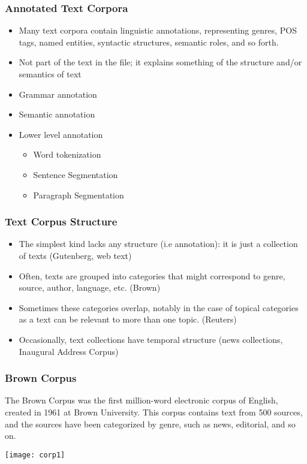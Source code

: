 \begin{frame}[fragile]\frametitle{Annotated Text Corpora}
\begin{itemize}
\item Many text corpora contain linguistic annotations, representing genres, POS tags, named entities, syntactic structures, semantic roles, and so forth. 
\item Not part of the text in the file; it explains something of the structure and/or semantics of text
\item Grammar annotation
\item Semantic annotation
\item Lower level annotation
\begin{itemize}
\item Word tokenization
\item Sentence Segmentation 
\item Paragraph Segmentation
\end{itemize}
\end{itemize}
\end{frame}


\begin{frame}[fragile]\frametitle{Text Corpus Structure}
\begin{itemize}
\item The simplest kind lacks any structure (i.e annotation): it is just a collection of texts (Gutenberg, web text)
\item Often, texts are grouped into categories that might correspond to genre, source, author, language, etc. (Brown)
\item Sometimes these categories overlap, notably in the case of topical categories as a text can be relevant to more than one topic. (Reuters)
\item Occasionally, text collections have temporal structure (news collections, Inaugural Address Corpus)
\end{itemize}
\end{frame}


\begin{frame}[fragile]\frametitle{Brown Corpus}
The Brown Corpus was the first million-word electronic corpus of English, created in 1961 at Brown University. This corpus contains text from 500 sources, and the sources have been categorized by genre, such as news, editorial, and so on. 
\begin{center}
\texttt{[image: corp1]}
\end{center}
\end{frame}

